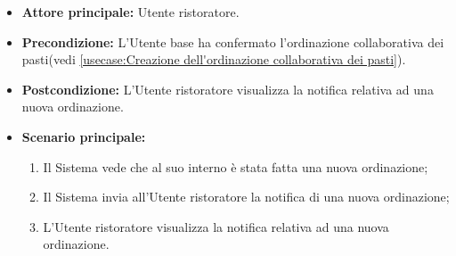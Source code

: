 \label{usecase:Visualizzazione notifica nuovo ordine}
\begin{itemize}
	\item \textbf{Attore principale:} Utente ristoratore.

	\item \textbf{Precondizione:} L'Utente base ha confermato l'ordinazione collaborativa dei pasti(vedi \autoref{usecase:Creazione dell'ordinazione collaborativa dei pasti}).

	\item \textbf{Postcondizione:} L'Utente ristoratore visualizza la notifica relativa ad una nuova ordinazione.

	\item \textbf{Scenario principale:}
	      \begin{enumerate}
		      \item Il Sistema vede che al suo interno è stata fatta una nuova ordinazione;
		      \item Il Sistema invia all'Utente ristoratore la notifica di una nuova ordinazione;
		      \item L'Utente ristoratore visualizza la notifica relativa ad una nuova ordinazione.
	      \end{enumerate}
\end{itemize}
